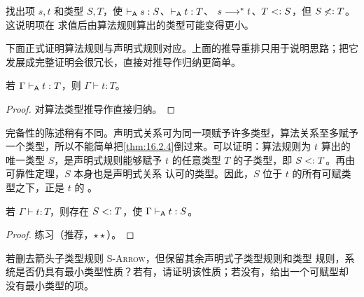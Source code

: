 \begin{exercise}[\(\star\star\), \(\nrightarrow\)]
\label{ex:16.2.3}
找出项 \(s,t\) 和类型 \(S,T\)，使
\(\mathrel{\vdash_{\mathsf A}} s:S\)、\(\mathrel{\vdash_{\mathsf A}} t:T\)、
\(s\mathrel{\longrightarrow^{*}} t\)、\(T\mathrel{<:} S\)，但 \(S\not\mathrel{<:} T\)。这说明项在
求值后由算法规则算出的类型可能变得更小。
\end{exercise}


下面正式证明算法规则与声明式规则对应。上面的推导重排只用于说明思路；把它
发展成完整证明会很冗长，直接对推导作归纳更简单。

\begin{theorem}[可靠性]
\label{thm:16.2.4}
若 \(\Gamma\mathrel{\vdash_{\mathsf A}} t:T\)，则 \(\Gamma\vdash t:T\)。
\end{theorem}
\begin{proof}
对算法类型推导作直接归纳。
\end{proof}

完备性的陈述稍有不同。声明式关系可为同一项赋予许多类型，算法关系至多赋予
一个类型，所以不能简单把\cref{thm:16.2.4}倒过来。可以证明：算法规则为
\(t\) 算出的唯一类型 \(S\)，是声明式规则能够赋予 \(t\) 的任意类型 \(T\)
的子类型，即 \(S\mathrel{<:} T\)。再由可靠性定理，\(S\) 本身也是声明式关系
认可的类型。因此，\(S\) 位于 \(t\) 的所有可赋类型之下，正是 \(t\) 的
。

\begin{theorem}
\label{thm:16.2.5}
若 \(\Gamma\vdash t:T\)，则存在 \(S\mathrel{<:} T\)，使
\(\Gamma\mathrel{\vdash_{\mathsf A}} t:S\)。
\end{theorem}
\begin{proof}
练习（推荐，\(\star\star\)）。
\end{proof}

\begin{exercise}[\(\star\star\)]
\label{ex:16.2.6}
若删去箭头子类型规则 \textsc{S-Arrow}，但保留其余声明式子类型规则和类型
规则，系统是否仍具有最小类型性质？若有，请证明该性质；若没有，给出一个可赋型却
没有最小类型的项。
\end{exercise}

